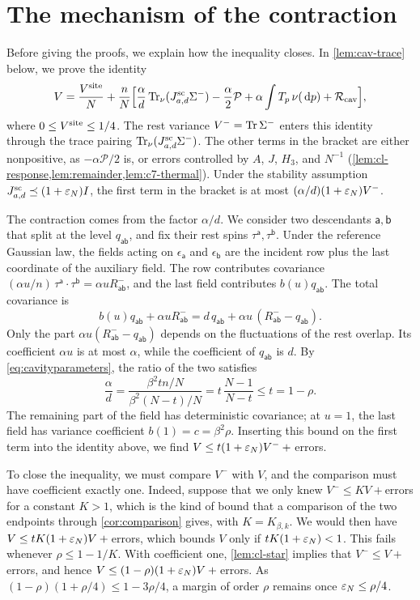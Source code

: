 \section{The mechanism of the contraction}\label{sec:c7-mechanism}

Before giving the proofs, we explain how the inequality closes. In
\cref{lem:cav-trace} below, we prove the identity
\[
 V=\frac{V^{\rm site}}N+\frac nN\Bigl[
 \frac\alpha d\operatorname{Tr}_\nu(J^{\mathrm{sc}}_{a,d}\Sigma^-)
 -\frac\alpha2\mathcal P+\alpha\int T_p\,\nu(\,\mathrm d p)
 +\mathcal R_{\rm cav}\Bigr],
\]
where $0\le V^{\rm site}\le1/4$. The rest variance $V^-=\operatorname{Tr}\Sigma^-$
enters this identity through the trace pairing
$\operatorname{Tr}_\nu(J^{\mathrm{sc}}_{a,d}\Sigma^-)$. The other terms in the
bracket are either nonpositive, as $-\alpha\mathcal P/2$ is, or errors
controlled by $A$, $J$, $H_3$, and $N^{-1}$
(\cref{lem:cl-response,lem:remainder,lem:c7-thermal}). Under the
stability assumption $J^{\mathrm{sc}}_{a,d}\preceq(1+\varepsilon_N)I$, the first term in
the bracket
is at most $(\alpha/d)(1+\varepsilon_N)V^-$.

The contraction comes from the factor $\alpha/d$. We consider two
descendants $\mathsf a,\mathsf b$ that split at the level
$q_{\mathsf{ab}}$, and fix their rest spins
$\tau^{\mathsf a},\tau^{\mathsf b}$. Under the reference Gaussian law,
the fields acting on $\epsilon_{\mathsf a}$ and $\epsilon_{\mathsf b}$
are the incident row plus the last coordinate of the auxiliary field.
The row contributes covariance $(\alpha u/n)\,\tau^{\mathsf a}\cdot
\tau^{\mathsf b}=\alpha uR^-_{\mathsf{ab}}$, and the last field
contributes $b(u)q_{\mathsf{ab}}$. The total covariance is
\[
 b(u)q_{\mathsf{ab}}+\alpha uR^-_{\mathsf{ab}}
 =d\,q_{\mathsf{ab}}+\alpha u\,(R^-_{\mathsf{ab}}-q_{\mathsf{ab}}).
\]
Only the part $\alpha u(R^-_{\mathsf{ab}}-q_{\mathsf{ab}})$ depends on
the fluctuations of the rest overlap. Its coefficient $\alpha u$ is at
most $\alpha$, while the coefficient of $q_{\mathsf{ab}}$ is $d$. By
\eqref{eq:cavityparameters}, the ratio of the two satisfies
\begin{equation}\label{eq:c7-alpha-d}
 \frac\alpha d=\frac{\beta^2tn/N}{\beta^2(N-t)/N}
 =t\,\frac{N-1}{N-t}\le t=1-\rho .
\end{equation}
The remaining part of the field has deterministic covariance; at
$u=1$, the last field has variance coefficient $b(1)=c=\beta^2\rho$.
Inserting this bound on the first term into the identity above, we
find $V\le t(1+\varepsilon_N)V^-+{}$errors.

To close the inequality, we must compare $V^-$ with $V$, and the
comparison must have coefficient exactly one. Indeed, suppose that we
only knew $V^-\le KV+{}$errors for a constant $K>1$, which is the kind
of bound that a comparison of the two endpoints through
\cref{cor:comparison} gives, with $K=K_{\beta,k}$. We would then have
$V\le tK(1+\varepsilon_N)V+{}$errors, which bounds $V$ only if
$tK(1+\varepsilon_N)<1$. This fails whenever $\rho\le1-1/K$. With coefficient
one, \cref{lem:cl-star} implies that $V^-\le V+{}$errors, and hence
$V\le(1-\rho)(1+\varepsilon_N)V+{}$errors. As
$(1-\rho)(1+\rho/4)\le1-3\rho/4$, a margin of order $\rho$ remains once
$\varepsilon_N\le\rho/4$.

